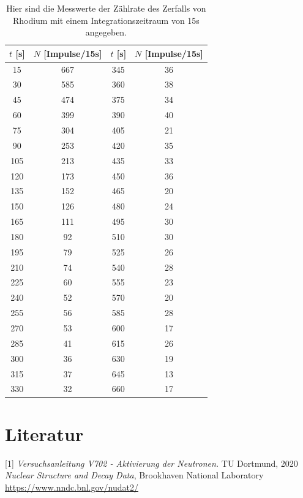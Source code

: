 \documentclass[titlepage = firstcover]{scrartcl}
\begin{document}
        \FloatBarrier

        \begin{table}[h]
            \centering
            \caption{Hier sind die Messwerte der Zählrate des Zerfalls von Rhodium mit einem Integrationszeitraum von 15s angegeben.}
            \label{tab:Rhodium}
            \begin{tabular}{c c c c}
            \toprule
            {$t$ [s]} & {$N$ [Impulse/15s]} & {$t$ [s]} & {$N$ [Impulse/15s]} \\
            \midrule
                15    &   667   &   345   &   36 \\ 
                30    &   585   &   360   &   38 \\ 
                45    &   474   &   375   &   34 \\
                60    &   399   &   390   &   40 \\
                75    &   304   &   405   &   21 \\
                90    &   253   &   420   &   35 \\
                105   &   213   &   435   &   33 \\
                120   &   173   &   450   &   36 \\
                135   &   152   &   465   &   20 \\
                150   &   126   &   480   &   24 \\
                165   &   111   &   495   &   30 \\
                180   &    92   &   510   &   30 \\
                195   &    79   &   525   &   26 \\
                210   &    74   &   540   &   28 \\
                225   &    60   &   555   &   23 \\
                240   &    52   &   570   &   20 \\
                255   &    56   &   585   &   28 \\
                270   &    53   &   600   &   17 \\
                285   &    41   &   615   &   26 \\
                300   &    36   &   630   &   19 \\
                315   &    37   &   645   &   13 \\
                330   &    32   &   660   &   17 \\
                \bottomrule
            \end{tabular}
        \end{table}

        \FloatBarrier

    \newpage
    \section{Literatur}
        [1] \textit{Versuchsanleitung V702 - Aktivierung der Neutronen.} TU Dortmund, 2020 \newline
        [2] \textit{Nuclear Structure and Decay Data}, Brookhaven National Laboratory \newline
        \url{https://www.nndc.bnl.gov/nudat2/}
\end{document}
